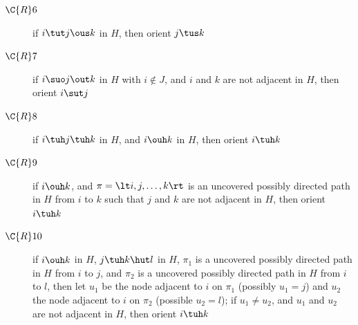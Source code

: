 \begin{algorithm}
\begin{algorithmic}[1]
\begin{description}
    \end{description}
  \Repeat
    \begin{description}
      \item[$\C{R}6$] if $i \tut j \ous k$ in $H$, then orient $j \tus k$
      \item[$\C{R}7$] if $i \suo j \out k$ in $H$ with $i \notin J$, and $i$ and $k$ are not adjacent in $H$, then orient $i \sut j$
    \end{description}
  \Repeat
    \begin{description}
      \item[$\C{R}8$] if $i \tuh j \tuh k$ in $H$, and $i \ouh k$ in $H$, then orient $i \tuh k$
      \item[$\C{R}9$] if $i \ouh k$, and $\pi = \lt i, j, \dots, k \rt$ is an uncovered possibly directed path in $H$ from $i$ to $k$ such that $j$ and $k$ are not adjacent in $H$, then orient $i \tuh k$
      \item[$\C{R}10$] if $i \ouh k$ in $H$, $j \tuh k \hut l$ in $H$, $\pi_1$ is a uncovered possibly directed path in $H$ from $i$ to $j$, and $\pi_2$ is a uncovered possibly directed path in $H$ from $i$ to $l$, then let $u_1$ be the node adjacent to $i$ on $\pi_1$ (possibly $u_1 = j$) and $u_2$ the node adjacent to $i$ on $\pi_2$ (possible $u_2 = l$); if $u_1 \ne u_2$, and $u_1$ and $u_2$ are not adjacent in $H$, then orient $i \tuh k$
    \end{description}
  \label{alg:fci:end_orient}
  \end{algorithmic}
  \caption{Extended FCI Algorithm.\label{alg:fci}}
\end{algorithm}

